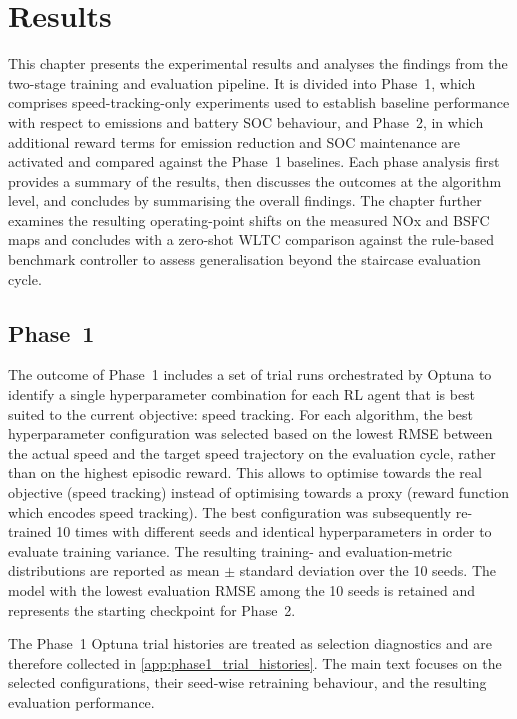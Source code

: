 \chapter{Results}
\label{chap:results}
This chapter presents the experimental results and analyses the findings from the two-stage training and evaluation pipeline. It is divided into Phase~1, which comprises speed-tracking-only experiments used to establish baseline performance with respect to emissions and battery \ac{SOC} behaviour, and Phase~2, in which additional reward terms for emission reduction and \ac{SOC} maintenance are activated and compared against the Phase~1 baselines. Each phase analysis first provides a summary of the results, then discusses the outcomes at the algorithm level, and concludes by summarising the overall findings. The chapter further examines the resulting operating-point shifts on the measured \ac{NOx} and \ac{BSFC} maps and concludes with a zero-shot \ac{WLTC} comparison against the rule-based benchmark controller to assess generalisation beyond the staircase evaluation cycle.

\section{Phase~1}
\label{sec:results_phase1}
The outcome of Phase~1 includes a set of trial runs orchestrated by Optuna to identify a single hyperparameter combination for each \ac{RL} agent that is best suited to the current objective: speed tracking. For each algorithm, the best hyperparameter configuration was selected based on the lowest \ac{RMSE} between the actual speed and the target speed trajectory on the evaluation cycle, rather than on the highest episodic reward. This allows to optimise towards the real objective (speed tracking) instead of optimising towards a proxy (reward function which encodes speed tracking). The best configuration was subsequently re-trained 10 times with different seeds and identical hyperparameters in order to evaluate training variance. The resulting training- and evaluation-metric distributions are reported as mean $\pm$ standard deviation over the 10 seeds. The model with the lowest evaluation \ac{RMSE} among the 10 seeds is retained and represents the starting checkpoint for Phase~2.

The Phase~1 Optuna trial histories are treated as selection diagnostics and are therefore collected in \autoref{app:phase1_trial_histories}. The main text focuses on the selected configurations, their seed-wise retraining behaviour, and the resulting evaluation performance.

